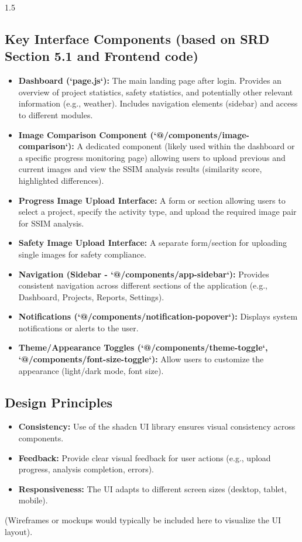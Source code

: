 \documentclass[12pt,a4paper]{report}
\begin{document}
\begin{spacing}{1.5}
    \subsection{Key Interface Components (based on SRD Section 5.1 and Frontend code)}
    \begin{itemize}
        \item \textbf{Dashboard (`page.js`):} The main landing page after login. Provides an overview of project statistics, safety statistics, and potentially other relevant information (e.g., weather). Includes navigation elements (sidebar) and access to different modules.
        \item \textbf{Image Comparison Component (`@/components/image-comparison`):} A dedicated component (likely used within the dashboard or a specific progress monitoring page) allowing users to upload previous and current images and view the SSIM analysis results (similarity score, highlighted differences).
        \item \textbf{Progress Image Upload Interface:} A form or section allowing users to select a project, specify the activity type, and upload the required image pair for SSIM analysis.
        \item \textbf{Safety Image Upload Interface:} A separate form/section for uploading single images for safety compliance.
        \item \textbf{Navigation (Sidebar - `@/components/app-sidebar`):} Provides consistent navigation across different sections of the application (e.g., Dashboard, Projects, Reports, Settings).
        \item \textbf{Notifications (`@/components/notification-popover`):} Displays system notifications or alerts to the user.
        \item \textbf{Theme/Appearance Toggles (`@/components/theme-toggle`, `@/components/font-size-toggle`):} Allow users to customize the appearance (light/dark mode, font size).
    \end{itemize}

    \subsection{Design Principles}
    \begin{itemize}
        \item \textbf{Consistency:} Use of the shadcn UI library ensures visual consistency across components.
        \item \textbf{Feedback:} Provide clear visual feedback for user actions (e.g., upload progress, analysis completion, errors).
        \item \textbf{Responsiveness:} The UI adapts to different screen sizes (desktop, tablet, mobile).
    \end{itemize}
    (Wireframes or mockups would typically be included here to visualize the UI layout).


\end{spacing}
\end{document}
